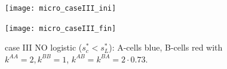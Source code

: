 \begin{figure}[htb]
	\begin{minipage}[t]{.45\textwidth}
		\centering
		\texttt{[image: micro\_caseIII\_ini]}
	\end{minipage}
	\hfill
	\begin{minipage}[t]{.45\textwidth}
		\centering
		\texttt{[image: micro\_caseIII\_fin]}
	\end{minipage}  
	\label{fig:1-2}
	\caption{{case III NO logistic ($s^{*}_{c} < s^{*}_{L}$): A-cells blue, B-cells red with $k^{AA}=2, k^{BB}=1 $, $k^{AB}=k^{BA}=2\cdot 0.73$.}}
\end{figure}














